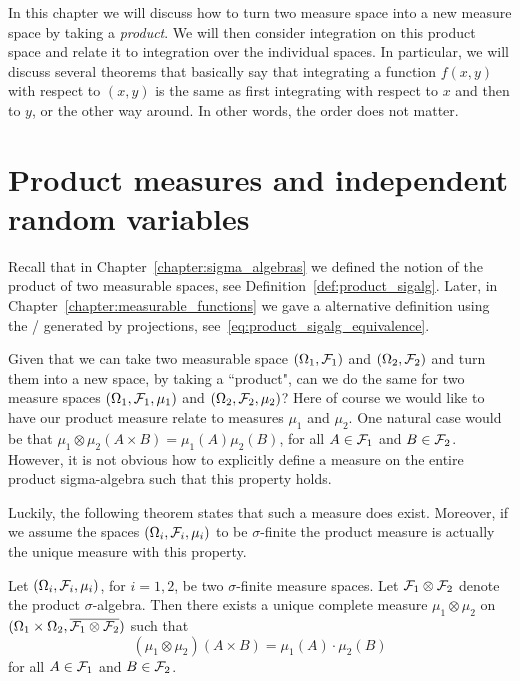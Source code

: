 
In this chapter we will discuss how to turn two measure space into a new measure space by taking a \emph{product}. We will then consider integration on this product space and relate it to integration over the individual spaces. In particular, we will discuss several theorems that basically say that integrating a function $f(x,y)$ with respect to $(x,y)$ is the same as first integrating with respect to $x$ and then to $y$, or the other way around. In other words, the order does not matter.

\section{Product measures and independent random variables}
\label{se:product-measures}

Recall that in Chapter~\ref{chapter:sigma_algebras} we defined the notion of the product of two measurable spaces, see Definition~\ref{def:product_sigalg}. Later, in Chapter~\ref{chapter:measurable_functions} we gave a alternative definition using the \sigalg/ generated by projections, see~\eqref{eq:product_sigalg_equivalence}. 

Given that we can take two measurable space $(\Omega_1, \mathcal F_1)$ and $(\Omega_2, \mathcal F_2)$ and turn them into a new space, by taking a ``product", can we do the same for two measure spaces $(\Omega_1, \mathcal F_1, \mu_1)$ and $(\Omega_2, \mathcal F_2, \mu_2)$? Here of course we would like to have our product measure relate to measures $\mu_1$ and $\mu_2$. One natural case would be that $\mu_1 \otimes \mu_2 (A \times B) =\mu_1(A) \mu_2(B)$, for all $A \in \mathcal F_1$ and $B \in \mathcal F_2$. However, it is not obvious how to explicitly define a measure on the entire product sigma-algebra such that this property holds.  

Luckily, the following theorem states that such a measure does exist. Moreover, if we assume the spaces $(\Omega_i, \mathcal F_i, \mu_i)$ to be $\sigma$-finite the product measure is actually the unique measure with this property. 


\begin{theorem}
	\label{th:construction-product-measure}
	Let $(\Omega_i, \mathcal F_i, \mu_i)$, for $i = 1, 2$,  be two $\sigma$-finite measure spaces. Let $\mathcal F_1 \otimes \mathcal F_2$ denote the product $\sigma$-algebra. 
	Then there exists a unique complete measure $\mu_1 \otimes \mu_2$ on 
	$(\Omega_1 \times \Omega_2, \overline{\mathcal F_1 \otimes \mathcal F_2})$ such that 
	\[
	(\mu_1 \otimes \mu_2)(A \times B ) = \mu_1(A) \cdot \mu_2(B)
	\]
	for all $A \in \mathcal F_1$ and $B \in \mathcal F_2$.
\end{theorem}

